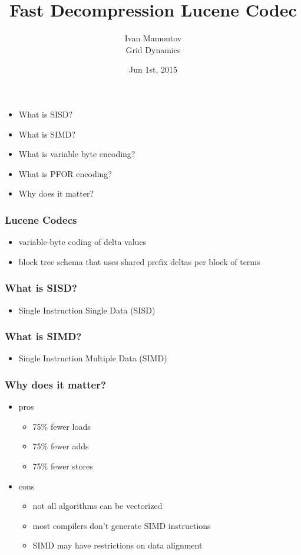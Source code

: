 \documentclass{beamer}
\title{Fast Decompression Lucene Codec}
\author{Ivan Mamontov\\ Grid Dynamics}
\institute{Berlin Buzzwords}
\date{Jun 1st, 2015}
\begin{document}
	\begin{frame}
		\titlepage
	\end{frame}
	\begin{frame}
    		\begin{itemize}
    		    \item What is SISD?
  			\item What is SIMD?
  			\item What is variable byte encoding?
  			\item What is PFOR encoding?
  			\item Why does it matter?
		\end{itemize}
  	\end{frame}
  	\begin{frame}
  		\frametitle{Lucene Codecs}
  		\begin{itemize}
  			\item variable-byte coding of delta values
  			\item block tree schema that uses shared prefix
deltas per block of terms
  		\end{itemize}
  	\end{frame}
  	\begin{frame}
    		\frametitle{What is SISD?}
    		\begin{itemize}
    		    \item Single Instruction Single Data (SISD)
		\end{itemize}
  	\end{frame}
  	\begin{frame}
    		\frametitle{What is SIMD?}
    		\begin{itemize}
    		    \item Single Instruction Multiple Data (SIMD)
		\end{itemize}
  	\end{frame}
  	\begin{frame}
    		\frametitle{Why does it matter?}
    		\begin{itemize}
    		    \item pros
    		    \begin{itemize}
    		    		\item 75\% fewer loads
    		    		\item 75\% fewer adds
    		    		\item 75\% fewer stores
    		    \end{itemize}
    		    \item cons
    		    \begin{itemize}
    		    		\item not all algorithms can be vectorized
    		    		\item most compilers don't generate SIMD instructions
    		    		\item SIMD may have restrictions on data alignment
    		    \end{itemize}
		\end{itemize}
  	\end{frame}
\end{document}
